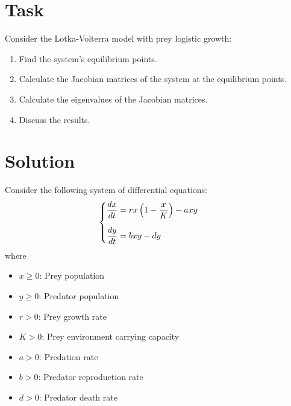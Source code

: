 \documentclass{article}
\begin{document}
	\section*{Task}
	Consider the Lotka-Volterra model with prey logistic growth:
	\begin{enumerate}
		\item Find the system's equilibrium points.
		\item Calculate the Jacobian matrices of the system at the equilibrium points.
		\item Calculate the eigenvalues of the Jacobian matrices.
		\item Discuss the results.
	\end{enumerate}
	
	\section*{Solution}
	Consider the following system of differential equations: \\
	\begin{align}
		&\begin{cases}
			\begin{aligned}
				\frac{dx}{dt} &= rx\left(1 - \frac{x}{K}\right) - a x y \vspace{0.5cm} \\[1em]
				\frac{dy}{dt} &= b x y - d y
 			\end{aligned}
		\end{cases}
	\end{align}
	where \\
	\begin{itemize}
		\item $x\ge0$: Prey population
		\item $y\ge0$: Predator population
		\item $r>0$: Prey growth rate
		\item $K>0$: Prey environment carrying capacity
		\item $a>0$: Predation rate
		\item $b>0$: Predator reproduction rate
		\item $d>0$: Predator death rate
	\end{itemize}
\end{document}
